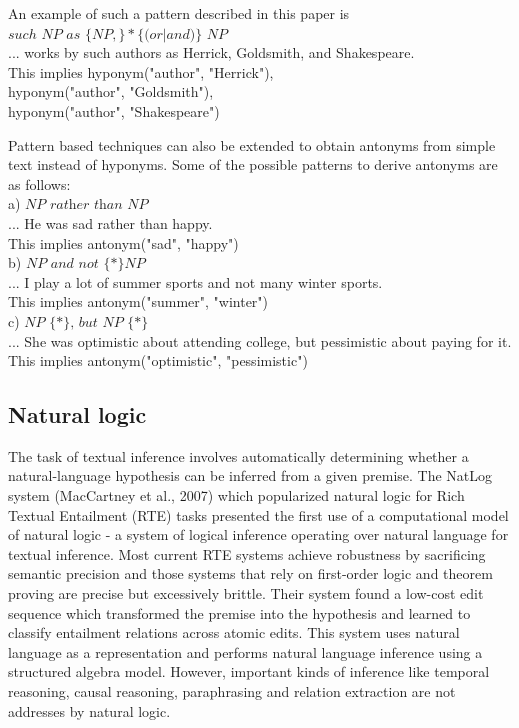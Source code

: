 \documentclass[11pt]{article}
\begin{document}
An example of such a pattern described in this paper is \\
$such$ $NP$ $as$ $\{NP ,\}*\{(or $$|$$ and)\}$ $NP$ \\
... works by such authors as Herrick,
Goldsmith, and Shakespeare. \\
This implies hyponym("author", "Herrick"), \\
hyponym("author", "Goldsmith"), \\
hyponym("author", "Shakespeare") 

Pattern based techniques can also be extended to obtain antonyms from simple text instead of hyponyms. Some of the possible patterns to derive antonyms are as follows: \\
a) $\textit{NP rather than NP}$\\
... He was sad rather than happy.\\
This implies antonym("sad", "happy")\\
b) $\textit{NP and not \{*\} NP}$\\
... I play a lot of summer sports and not many winter sports. \\
This implies antonym("summer", "winter")\\
c) $\textit{NP \{*\}, but NP \{*\}}$\\
... She was optimistic about attending college, but pessimistic about paying for it. \\
This implies antonym("optimistic", "pessimistic")\\

\subsection{Natural logic}
 The task of textual inference involves automatically determining whether a natural-language hypothesis can be inferred from a given premise. The NatLog system (MacCartney et al., 2007) which popularized natural logic for Rich Textual Entailment (RTE) tasks presented the first use of a computational model of natural logic - a system of logical inference operating over natural language for textual inference. Most current RTE systems achieve robustness by sacrificing semantic precision and those systems that rely on first-order logic and theorem proving are precise but excessively brittle. Their system found a low-cost edit sequence which transformed the premise into the hypothesis and learned to classify entailment relations across atomic edits. This system uses natural language as a representation and performs natural language inference using a structured algebra model.
 However, important kinds of inference like temporal reasoning, causal reasoning, paraphrasing and relation extraction are not addresses by natural logic.
\end{document}
